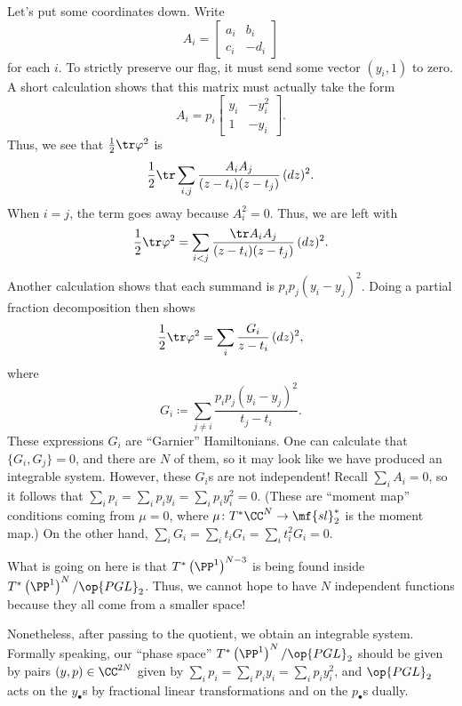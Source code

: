 \documentclass[../notes.tex]{subfiles}
\begin{document}
Let's put some coordinates down. Write
\[A_i=\begin{bmatrix}
	a_i & b_i \\
	c_i & -d_i
\end{bmatrix}\]
for each $i$. To strictly preserve our flag, it must send some vector $(y_i,1)$ to zero. A short calculation shows that this matrix must actually take the form
\[A_i=p_i\begin{bmatrix}
	y_i & -y_i^2 \\
	1 & -y_i
\end{bmatrix}.\]
Thus, we see that $\frac12\tr\varphi^2$ is
\[\frac12\tr\sum_{i,j}\frac{A_iA_j}{(z-t_i)(z-t_j)}\,(dz)^2.\]
When $i=j$, the term goes away because $A_i^2=0$. Thus, we are left with
\[\frac12\tr\varphi^2=\sum_{i<j}\frac{\tr A_iA_j}{(z-t_i)(z-t_j)}\,(dz)^2.\]
Another calculation shows that each summand is $p_ip_j(y_i-y_j)^2$. Doing a partial fraction decomposition then shows
\[\frac12\tr\varphi^2=\sum_i\frac{G_i}{z-t_i}\,(dz)^2,\]
where
\[G_i\coloneqq\sum_{j\ne i}\frac{p_ip_j(y_i-y_j)^2}{t_j-t_i}.\]
These expressions $G_i$ are ``Garnier'' Hamiltonians. One can calculate that $\{G_i,G_j\}=0$, and there are $N$ of them, so it may look like we have produced an integrable system. However, these $G_i$s are not independent! Recall $\sum_iA_i=0$, so it follows that $\sum_ip_i=\sum_ip_iy_i=\sum_ip_iy_i^2=0$. (These are ``moment map'' conditions coming from $\mu=0$, where $\mu\colon T^*\CC^N\to\mf{sl}_2^*$ is the moment map.) On the other hand, $\sum_iG_i=\sum_it_iG_i=\sum_it_i^2G_i=0$.
\begin{remark}
	What is going on here is that $T^*\left(\PP^1\right)^{N-3}$ is being found inside $T^*\left(\PP^1\right)^N/\op{PGL}_2$. Thus, we cannot hope to have $N$ independent functions because they all come from a smaller space!
\end{remark}
Nonetheless, after passing to the quotient, we obtain an integrable system. Formally speaking, our ``phase space'' $T^*\left(\PP^1\right)^N/\op{PGL}_2$ should be given by pairs $(y,p)\in\CC^{2N}$ given by $\sum_ip_i=\sum_ip_iy_i=\sum_ip_iy_i^2$, and $\op{PGL}_2$ acts on the $y_\bullet$s by fractional linear transformations and on the $p_\bullet$s dually.
\end{document}
